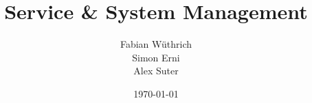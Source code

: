 \titlehead{Hochschule Luzern \\ 
	Technik \& Architektur}
\subject{Zusammenfassung}
\title{Service \& System Management}
\subtitle{}
\author{Fabian Wüthrich \\ 
	Simon Erni \\ 
	Alex Suter}
\date{\today}

\maketitle
